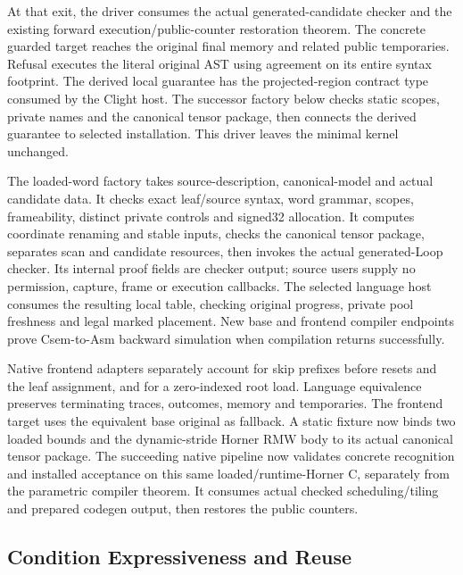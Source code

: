 At that exit, the driver consumes the actual generated-candidate checker and
the existing forward execution/public-counter restoration theorem. The concrete
guarded target reaches the original final memory and related public temporaries.
Refusal executes the literal original AST using agreement on its entire syntax
footprint. The derived local guarantee has the projected-region contract type
consumed by the Clight host. The successor factory below checks static scopes,
private names and the canonical tensor package, then connects the derived
guarantee to selected installation. This driver leaves the minimal kernel unchanged.

The loaded-word factory takes source-description, canonical-model and actual
candidate data. It checks exact leaf/source syntax, word grammar, scopes,
frameability, distinct private controls and signed32 allocation. It computes
coordinate renaming and stable inputs, checks the canonical tensor package,
separates scan and candidate resources, then invokes the actual generated-Loop
checker. Its internal proof fields are checker output; source users supply no
permission, capture, frame or execution callbacks. The selected language host
consumes the resulting local table, checking original progress, private pool
freshness and legal marked placement. New base and frontend compiler endpoints
prove Csem-to-Asm backward simulation when compilation returns successfully.

Native frontend adapters separately account for skip prefixes before resets
and the leaf assignment, and for a zero-indexed root load. Language equivalence
preserves terminating traces, outcomes, memory and temporaries. The frontend
target uses the equivalent base original as fallback. A static fixture now binds
two loaded bounds and the dynamic-stride Horner RMW body to its actual canonical
tensor package. The succeeding native pipeline now validates concrete recognition and installed
acceptance on this same loaded/runtime-Horner C, separately from the parametric
compiler theorem. It consumes actual checked scheduling/tiling and prepared
codegen output, then restores the public counters.

\subsection{Condition Expressiveness and Reuse}

